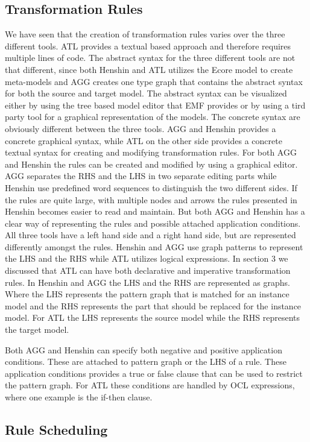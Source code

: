 \subsection{Transformation Rules}
We have seen that the creation of transformation rules varies over the three
different tools. ATL provides a textual based approach and therefore requires
multiple lines of code. The abstract syntax for the three different tools are
not that different, since both Henshin and ATL utilizes the Ecore model to
create meta-models and AGG creates one type graph that contains the abstract
syntax for both the source and target model. The abstract syntax can be
visualized either by using the tree based model editor that EMF provides or by
using a tird party tool for a graphical representation of the models. The
concrete syntax are obviously different between the three tools. AGG and Henshin
provides a concrete graphical syntax, while ATL on the other side provides a
concrete textual syntax for creating and modifying transformation rules. For
both AGG and Henshin the rules can be created and modified by using a graphical
editor. AGG separates the RHS and the LHS in two separate editing parts while
Henshin use predefined word sequences to distinguish the two different sides.
If the rules are quite large, with multiple nodes and arrows the rules
presented in Henshin becomes easier to read and maintain. But both AGG and
Henshin has a clear way of representing the rules and possible attached
application conditions. All three tools have a left hand side
and a right hand side, but are represented differently amongst the rules.
Henshin and AGG use graph patterns to represent the LHS and the RHS while ATL
utilizes logical expressions. In section 3 we discussed that ATL can have both
declarative and imperative transformation rules. In Henshin and AGG the LHS and
the RHS are represented as graphs. Where the LHS represents the pattern graph
that is matched for an instance model and the RHS represents the part that should be
replaced for the instance model. For ATL the LHS represents the source model
while the RHS represents the target model. 

Both AGG and Henshin can specify both negative and positive application
conditions. These are attached to pattern graph or the LHS of a rule. These
application conditions provides a true or false clause that can be used to
restrict the pattern graph. For ATL these conditions are handled by OCL
expressions, where one example is the if-then clause.

\subsection{Rule Scheduling}

